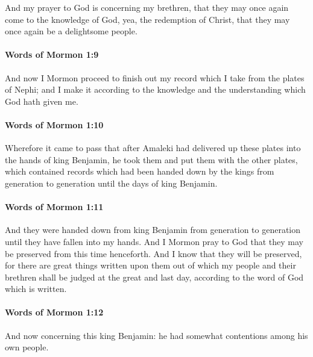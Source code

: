			And my prayer to God is concerning my brethren,
			that they may once again come to the knowledge of God,
			yea, the redemption of Christ,
			that they may once again be a delightsome people.

		\paragraph{Words of Mormon 1:9} %
			\label{WORDSOFMORMON-1-9}

			And now I Mormon proceed to finish out my record
			which I take from the plates of Nephi;
			and I make it according to the knowledge and the understanding
			which God hath given me.

		\paragraph{Words of Mormon 1:10} %
			\label{WORDSOFMORMON-1-10}

			Wherefore it came to pass that
			after Amaleki had delivered up these plates into the hands of king Benjamin,
			he took them and put them with the other plates,
			which contained records which had been handed down
			by the kings from generation to generation until the days of king Benjamin.

		\paragraph{Words of Mormon 1:11} %
			\label{WORDSOFMORMON-1-11}

			And they were handed down from king Benjamin from generation to generation
			until they have fallen into my hands.
			And I Mormon pray to God
			that they may be preserved from this time henceforth.
			And I know that they will be preserved,
			for there are great things written upon them
			out of which my people and their brethren shall be judged at the great and last day,
			according to the word of God which is written.

		\paragraph{Words of Mormon 1:12} %
			\label{WORDSOFMORMON-1-12}

			And now concerning this king Benjamin:
			he had somewhat contentions among his own people.

